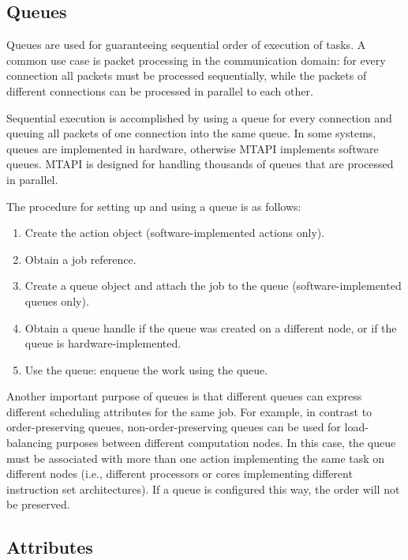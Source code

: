 \subsection{Queues}

Queues are used for guaranteeing sequential order of execution of tasks. A common use case is packet processing in the communication domain: for every connection all packets must be processed sequentially, while the packets of different connections can be processed in parallel to each other.

Sequential execution is accomplished by using a queue for every connection and queuing all packets of one connection into the same queue. In some systems, queues are implemented in hardware, otherwise MTAPI implements software queues. MTAPI is designed for handling thousands of queues that are processed in parallel.

The procedure for setting up and using a queue is as follows:
\begin{enumerate}
  \item Create the action object (software-implemented actions only).
  \item Obtain a job reference.
  \item Create a queue object and attach the job to the queue (software-implemented queues only).
  \item Obtain a queue handle if the queue was created on a different node, or if the queue is hardware-implemented.
  \item Use the queue: enqueue the work using the queue.
\end{enumerate}
Another important purpose of queues is that different queues can express different scheduling attributes for the same job. For example, in contrast to order-preserving queues, non-order-preserving queues can be used for load-balancing purposes between different computation nodes. In this case, the queue must be associated with more than one action implementing the same task on different nodes (i.e., different processors or cores implementing different instruction set architectures). If a queue is configured this way, the order will not be preserved.

\subsection{Attributes}

